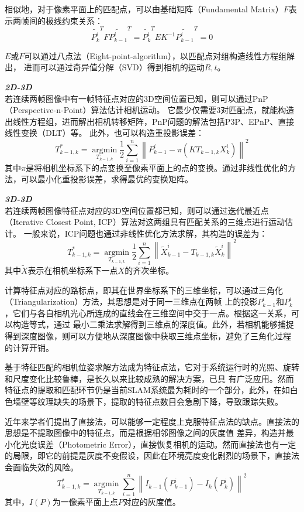     相似地，对于像素平面上的匹配点，可以由基础矩阵（Fundamental Matrix）$F$表示两帧间的极线约束关系：
    $${\widetilde{P_{k}^{i}}}^{T}F{\widetilde{P_{k-1}^{i}}}^{T}={\widetilde{P_{k}^{i}}}^{T}EK^{-1}{\widetilde{P_{k-1}^{i}}}^{T}=0$$

    $E$或$F$可以通过八点法（Eight-point-algorithm）\citep{HartleyIn}，\citep{LONGUET1981A}以匹配点对组构造线性方程组解出，
    进而可以通过奇异值分解（SVD）得到相机的运动$R,t$。
    
\emph{\textbf{2D-3D}}\\若连续两帧图像中有一帧特征点对应的3D空间位置已知，则可以通过PnP（Perspective-n-Point）算法估计相机运动。
它最少仅需要3对匹配点，就能构造出线性方程组，进而解出相机转移矩阵，PnP问题的解法包括P3P\citep{GaoComplete}、EPnP\citep{lepetit2009epnp}、直接线性变换（DLT）等。
此外，也可以构造重投影误差：
$$T_{k-1,k}^{*}=\mathop{argmin}\limits_{T_{k-1,k}}\frac{1}{2}\sum\limits_{i=1}^{n}\left \| P_{k-1}^{i}-\pi \left(KT_{k-1,k}X_{k}^{i}\right) \right \|^{2}$$
其中$\pi$是将相机坐标系下的点变换至像素平面上的点的变换。通过非线性优化的方法，可以最小化重投影误差，求得最优的变换矩阵。

\emph{\textbf{3D-3D}}\\若连续两帧图像特征点对应的3D空间位置都已知，则可以通过迭代最近点（Iterative Closest Point, ICP）算法对这两组具有匹配关系的三维点进行运动估计。
一般来说，ICP问题也通过非线性优化方法求解，其构造的误差为：
$$T_{k-1,k}^{*}=\mathop{argmin}\limits_{T_{k-1,k}}\frac{1}{2}\sum\limits_{i=1}^{n}\left \| \widetilde{X}_{k-1}^{i}-T_{k-1,k}\widetilde{X}_{k}^{i} \right \|^{2}$$
其中$\widetilde{X}$表示在相机坐标系下一点$X$的齐次坐标。

计算特征点对应的路标点，即其在世界坐标系下的三维坐标，可以通过三角化（Triangularization）方法，其思想是对于同一三维点在两帧
上的投影$P_{k-1}^{i}$和$P_{k}^{i}$，它们与各自相机光心所连成的直线会在三维空间中交于一点。根据这一关系，可以构造等式，通过
最小二乘法求解得到三维点的深度值。此外，若相机能够捕捉得到深度图像，则可以方便地从深度图像中获取三维点坐标，避免了三角化过程
的计算开销。

基于特征匹配的相机位姿求解方法成为特征点法，它对于系统运行时的光照、旋转和尺度变化比较鲁棒，是长久以来比较成熟的解决方案，已具
有广泛应用。然而特征点的提取和匹配环节仍是当前SLAM系统最为耗时的一个部分，此外，在如白色墙壁等纹理缺失的场景下，提取的特征点数目会急剧下降，导致跟踪失败。

近年来学者们提出了直接法，可以能够一定程度上克服特征点法的缺点。直接法的思想是不提取图像中的特征点，而是根据相邻图像之间的灰度值
差异，构造并最小化光度误差（Photometric Error），直接恢复相机的运动。然而直接法也有一定的局限，即它的前提是灰度不变假设，因此在环境亮度变化剧烈的场景下，直接法会面临失效的风险。
$$T_{k-1,k}^{*}=\mathop{argmin}\limits_{T_{k-1,k}}\sum\limits_{i=1}^{n}\left \| I_{k-1}(P_{k-1}^{i})-I_{k}(P_{k}^{i}) \right \|^{2}$$
其中，$I(P)$为一像素平面上点$P$对应的灰度值。

